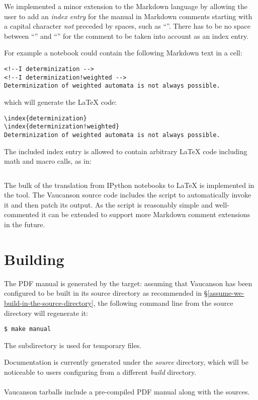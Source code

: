 We implemented a minor extension to the Markdown language by allowing
the user to add an \textit{index entry} for the manual in Markdown
comments starting with a capital  character \textit{not} preceded by
  spaces, such as ``''.  There has to be no space
  between ``\CODE{<!--}'' and ``'' for the comment to be taken into
  account as an index entry.

For example a notebook could contain the following Markdown text in a cell:
\begin{verbatim}
<!--I determinization -->
<!--I determinization!weighted -->
Determinization of weighted automata is not always possible.
\end{verbatim}
which will generate the \LaTeX{} code:
\begin{verbatim}
\index{determinization}
\index{determinization!weighted}
Determinization of weighted automata is not always possible.
\end{verbatim}

The included index entry is allowed to contain arbitrary \LaTeX{}
code including math and macro calls, as in:
\begin{verbatim}

\end{verbatim}

The bulk of the translation from IPython notebooks to \LaTeX{} is implemented
in the  tool.  The Vaucanson source code
includes the script  to automatically
invoke it and then patch its output.  As the script is reasonably simple
and well-commented it can be extended to support more Markdown comment
extensions in the future.

\section{Building}
The PDF manual is generated by the  target: assuming that
Vaucanson has been configured to be built in its source directory as
recommended in §\ref{assume-we-build-in-the-source-directory}, the
following command line from the source directory will regenerate it:\
\begin{verbatim}
$ make manual
\end{verbatim}
The subdirectory  is used for temporary
files.

Documentation is currently generated under the \textit{source}
directory, which will be noticeable to users configuring from a
different \textit{build} directory.
\\\\
Vaucanson tarballs include a pre-compiled PDF manual along with the sources.
